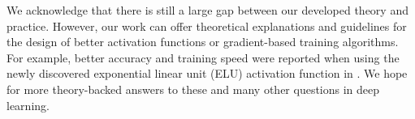 %

%
%


We acknowledge that there is still a large gap between our developed theory and practice. However, our work can offer theoretical explanations and guidelines for the design of better activation functions or gradient-based training algorithms. For example, better accuracy and training speed were reported when using the newly discovered exponential linear unit (ELU) activation function in \cite{ClevertUH15, ShahKSS16}. We hope for more theory-backed answers to these and many other questions in deep learning.



